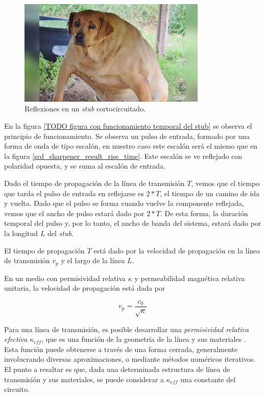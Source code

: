 \begin{figure}[tbp]
    \centering
    \includegraphics[width=0.8\textwidth]{images/placeholder.jpg}
    \caption{Reflexiones en un \textit{stub} cortocircuitado.}
    \label{fig:images-placeholder-jpg}
\end{figure}

En la figura \ref{TODO figura con funcionamiento temporal del stub} se observa
el principio de funcionamiento. Se observa un pulso de entrada, formado por una
forma de onda de tipo escalón, en nuestro caso este escalón será el mismo que en
la figura \ref{srd_sharpener_result_rise_time}. Este escalón se ve reflejado con
polaridad opuesta, y se suma al escalón de entrada.

Dado el tiempo de propagación de la línea de transmisión $T$, vemos que el
tiempo que tarda el pulso de entrada en reflejarse es $2*T$, el tiempo de un
camino de ida y vuelta. Dado que el pulso se forma cuando vuelve la componente
reflejada, vemos que el ancho de pulso estará dado por $2*T$. De esta forma, la
duración temporal del pulso y, por lo tanto, el ancho de banda del sistema,
estará dado por la longitud $L$ del \textit{stub}.

El tiempo de propagación $T$ está dado por la velocidad de propagación en la
línea de transmisión $v_p$ y el largo de la línea $L$.

En un medio con permisividad relativa $\kappa$ y permeabilidad magnética
relativa unitaria, la velocidad de propagación está dada por \cite{pozar2011}

\begin{equation}
  v_p = \frac{c_0}{\sqrt{\kappa}}
\end{equation}

Para una línea de transmisión, es posible desarrollar una \textit{permisividad
relativa efectiva} $\kappa_{eff}$, que es una función de la geometría de la
línea y sus materiales \cite{pozar2011}. Esta función puede obtenerse a través
de una forma cerrada, generalmente involucrando diversas aproximaciones, o
mediante métodos numéricos iterativos. El punto a resaltar es que, dada una
determinada estructura de línea de transmisión y sus materiales, se puede
considerar a $\kappa_{eff}$ una constante del circuito.

